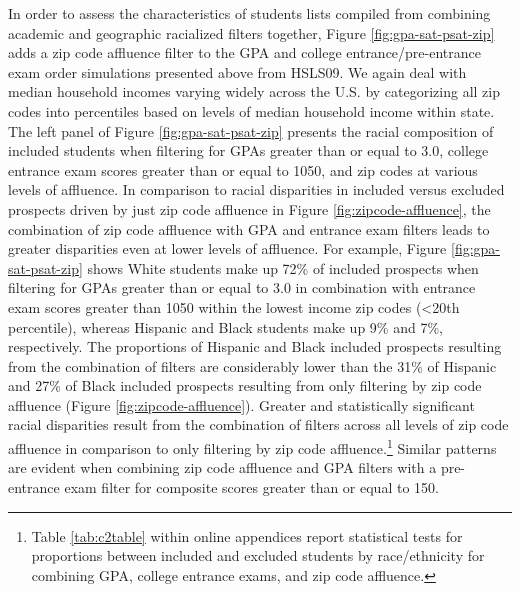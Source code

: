 \documentclass[
  12pt,
]{article}
\begin{document}
In order to assess the characteristics of students lists compiled from combining academic and geographic racialized filters together, Figure \ref{fig:gpa-sat-psat-zip} adds a zip code affluence filter to the GPA and college entrance/pre-entrance exam order simulations presented above from HSLS09. We again deal with median household incomes varying widely across the U.S. by categorizing all zip codes into percentiles based on levels of median household income within state. The left panel of Figure \ref{fig:gpa-sat-psat-zip} presents the racial composition of included students when filtering for GPAs greater than or equal to 3.0, college entrance exam scores greater than or equal to 1050, and zip codes at various levels of affluence. In comparison to racial disparities in included versus excluded prospects driven by just zip code affluence in Figure \ref{fig:zipcode-affluence}, the combination of zip code affluence with GPA and entrance exam filters leads to greater disparities even at lower levels of affluence. For example, Figure \ref{fig:gpa-sat-psat-zip} shows White students make up 72\% of included prospects when filtering for GPAs greater than or equal to 3.0 in combination with entrance exam scores greater than 1050 within the lowest income zip codes (\textless20th percentile), whereas Hispanic and Black students make up 9\% and 7\%, respectively. The proportions of Hispanic and Black included prospects resulting from the combination of filters are considerably lower than the 31\% of Hispanic and 27\% of Black included prospects resulting from only filtering by zip code affluence (Figure \ref{fig:zipcode-affluence}). Greater and statistically significant racial disparities result from the combination of filters across all levels of zip code affluence in comparison to only filtering by zip code affluence.\footnote{Table \ref{tab:c2table} within online appendices report statistical tests for proportions between included and excluded students by race/ethnicity for combining GPA, college entrance exams, and zip code affluence.} Similar patterns are evident when combining zip code affluence and GPA filters with a pre-entrance exam filter for composite scores greater than or equal to 150.
\end{document}
